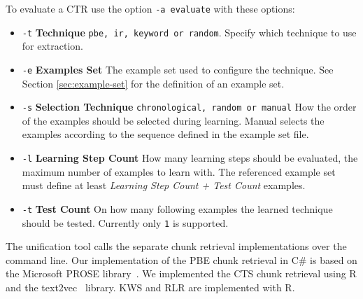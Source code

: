 \documentclass[\myrootdir/main.tex]{subfiles}
\begin{document}
To evaluate a CTR use the option \texttt{-a evaluate} with these options:
\begin{itemize}
    \item \texttt{-t} \textbf{Technique} \texttt{pbe, ir, keyword or random}. Specify which technique to use for extraction.
    \item \texttt{-e} \textbf{Examples Set} The example set used to configure the technique. See Section \ref{sec:example-set} for the definition of an example set.
    \item \texttt{-s} \textbf{Selection Technique} \texttt{chronological, random or manual} How the order of the examples should be selected during learning.
    Manual selects the examples according to the sequence defined in the example set file.
    \item \texttt{-l} \textbf{Learning Step Count} How many learning steps should be evaluated, the maximum number of examples to learn with.
    The referenced example set must define at least \emph{Learning Step Count + Test Count} examples.
    \item \texttt{-t} \textbf{Test Count} On how many following examples the learned technique should be tested.
    Currently only \texttt{1} is supported.
\end{itemize}

The unification tool calls the separate chunk retrieval implementations over the command line.
Our implementation of the PBE chunk retrieval in C\# is based on the Microsoft PROSE library~\cite{prose2019webpage}.
We implemented the CTS chunk retrieval using R and the text2vec~\cite{text2vec2019webpage} library.
KWS and RLR are implemented with R.




\end{document}
